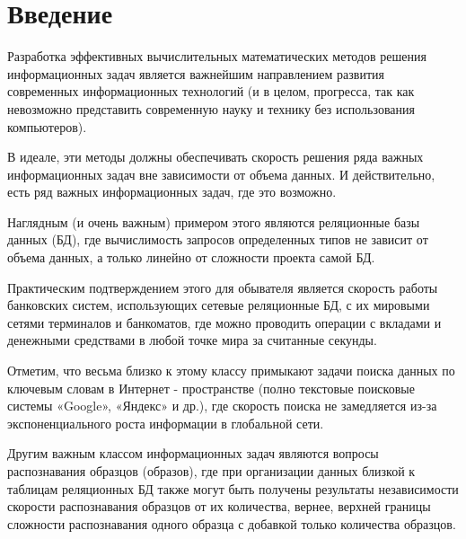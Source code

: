 \chapter*{Введение}							%
%


Разработка эффективных вычислительных математических методов решения информационных задач является важнейшим направлением развития современных информационных технологий (и в целом, прогресса, так как невозможно представить современную науку и технику  без использования компьютеров). 

В идеале, эти методы должны обеспечивать скорость решения ряда важных информационных задач вне зависимости от объема данных. И действительно, есть ряд важных  информационных задач, где это возможно. 

Наглядным (и очень важным) примером  этого являются реляционные базы данных (БД), где вычислимость запросов определенных типов не зависит от объема данных, а только линейно от сложности проекта самой БД.

Практическим подтверждением этого для обывателя является скорость работы банковских систем, использующих сетевые реляционные БД,  с их мировыми сетями терминалов и банкоматов, где можно проводить операции с вкладами и денежными средствами в любой точке мира за считанные секунды.

Отметим, что весьма близко к этому классу  примыкают задачи поиска данных по ключевым словам в Интернет - пространстве (полно текстовые поисковые системы «Google»\cite{D23}, «Яндекс» и др.), где скорость поиска не замедляется из-за экспоненциального роста информации в глобальной сети.

Другим  важным классом информационных задач являются вопросы распознавания  образцов (образов), где при организации данных близкой к таблицам реляционных БД также могут быть получены результаты независимости скорости  распознавания  образцов от их количества\cite{D14}, вернее, верхней границы сложности распознавания одного образца с добавкой только количества образцов. 


